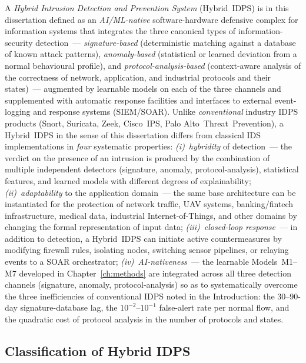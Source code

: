 A \emph{Hybrid Intrusion Detection and Prevention System}
(Hybrid~IDPS) is in this dissertation defined as an \emph{AI/ML-native}
software-hardware defensive complex for information systems that
integrates the three canonical types of information-security
detection~--- \emph{signature-based} (deterministic matching against a
database of known attack patterns), \emph{anomaly-based} (statistical
or learned deviation from a normal behavioural profile), and
\emph{protocol-analysis-based} (context-aware analysis of the
correctness of network, application, and industrial protocols and
their states)~--- augmented by learnable models on each of the three
channels and supplemented with automatic response facilities and
interfaces to external event-logging and response systems (SIEM/SOAR). Unlike \emph{conventional} industry IDPS products (Snort, Suricata,
Zeek, Cisco~IPS, Palo Alto~Threat~Prevention), a Hybrid~IDPS in the
sense of this dissertation differs from classical IDS implementations
in \emph{four} systematic properties:
\emph{(i)}~\emph{hybridity} of detection~--- the verdict on the
presence of an intrusion is produced by the combination of multiple
independent detectors (signature, anomaly, protocol-analysis),
statistical features, and learned models with different degrees of
explainability;
\emph{(ii)}~\emph{adaptability} to the application domain~--- the
same base architecture can be instantiated for the protection of
network traffic, UAV systems, banking/fintech infrastructure,
medical data, industrial Internet-of-Things, and other domains by
changing the formal representation of input data;
\emph{(iii)}~\emph{closed-loop response}~--- in addition to detection,
a Hybrid~IDPS can initiate active countermeasures by modifying
firewall rules, isolating nodes, switching sensor pipelines, or
relaying events to a SOAR orchestrator;
\emph{(iv)}~\emph{AI-nativeness}~--- the learnable Models~M1--M7
developed in Chapter~\ref{ch:methods} are integrated across all three
detection channels (signature, anomaly, protocol-analysis) so as to
systematically overcome the three inefficiencies of conventional
IDPS noted in the Introduction: the 30--90-day signature-database
lag, the $10^{-2}$--$10^{-1}$ false-alert rate per normal flow, and
the quadratic cost of protocol analysis in the number of protocols
and states.

\subsection{Classification of Hybrid IDPS}
\label{subsec:idps_classification}

